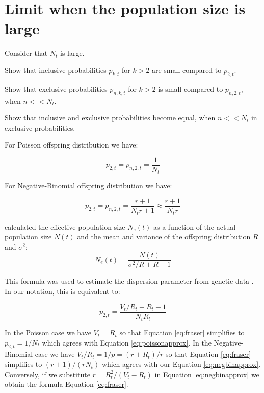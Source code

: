 \documentclass{article}
\begin{document}
\section{Limit when the population size is large}

Consider that $N_t$ is large. 

Show that inclusive probabilities $p_{k,t}$ for $k>2$ are small compared to $p_{2,t}$.

Show that exclusive probabilities $p_{n,k,t}$ for $k>2$ is small compared to $p_{n,2,t}$, when $n<<N_t$.

Show that inclusive and exclusive probabilities become equal, when $n<<N_t$ in exclusive probabilities.

For Poisson offspring distribution we have:

\begin{equation}
p_{2,t}=p_{n,2,t}=\frac{1}{N_t}\label{eq:poissonapprox}
\end{equation}

For Negative-Binomial offspring distribution we have:

\begin{equation}
p_{2,t}=p_{n,2,t}=\frac{r+1}{N_t r +1} \approx \frac{r+1}{N_t r}\label{eq:negbinapprox}
\end{equation}

\citet{Fraser2017} calculated the effective population size $N_e(t)$ 
as a function of the actual population size $N(t)$ and the mean and variance of the offspring distribution $R$ and $\sigma^2$:
\begin{equation}
N_e(t)=\frac{N(t)}{\sigma^2/R+R-1}
\end{equation}

This formula was used to estimate the dispersion parameter from genetic data \citep{Li2017}.
In our notation, this is equivalent to:

\begin{equation}
 p_{2,t}=\frac{V_t/R_t+R_t-1}{N_t R_t}\label{eq:fraser}
 \end{equation}

In the Poisson case we have $V_t=R_t$ so that Equation \eqref{eq:fraser} simplifies to $p_{2,t}=1/N_t$ which agrees with Equation \eqref{eq:poissonapprox}. 
In the Negative-Binomial case we have $V_t/R_t=1/p=(r+R_t)/r$ so that Equation \eqref{eq:fraser}
simplifies to $(r+1)/(rN_t)$ which agrees with our Equation \eqref{eq:negbinapprox}. 
Conversely, if we substitute $r=R_t^2/(V_t-R_t)$
in Equation \eqref{eq:negbinapprox} we obtain the formula Equation \eqref{eq:fraser}.
\end{document}
